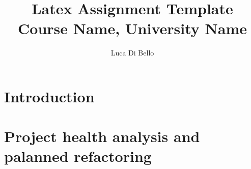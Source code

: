 \documentclass[a4paper, 11pt]{article}
\title{Latex Assignment Template\\\large Course Name, University Name}
\author{Luca Di Bello}
\date{\displaydate{today}}
\begin{document}
\maketitle

\section{Introduction}


\section{Project health analysis and palanned refactoring}
\label{sec:project_health_analysis}


\nocite{*} %
\printbibliography
\end{document}
